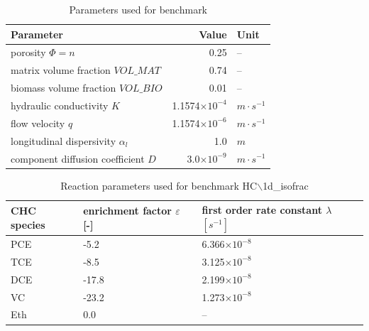 \begin{table}[htbp]
\caption{Parameters used for benchmark}
\centering
\begin{tabular}{lrl}
\hline
Parameter & Value & Unit \\
\hline
porosity $\Phi = n $  & 0.25 &  --  \\			
matrix volume fraction $VOL\_MAT $  & 0.74 &  --  \\			
biomass volume fraction $VOL\_BIO $  & 0.01 &  --  \\			
hydraulic conductivity $K$ & 1.1574$\times 10^{-4}$ & $m \cdot s^{-1}$ \\
flow velocity $q$ & 1.1574$\times 10^{-6}$ & $m \cdot s^{-1}$ \\
longitudinal dispersivity $\alpha_l$ & 1.0 & $m$ \\
component diffusion coefficient $D$ & 3.0$\times 10^{-9}$ & $m \cdot s^{-1}$ \\
\hline
\end{tabular}
\label{l_tab_benchmark_isofrac_flow}
\end{table}


\begin{table}[htbp]
\caption{Reaction parameters used for benchmark HC$\backslash$1d\_isofrac }
\centering
\begin{tabular}{|l|l|l|}
\hline
CHC species & enrichment factor $\varepsilon$ [-] & first order rate constant $\lambda $ $[s^{-1}]$ \\
\hline
PCE & -5.2 & 6.366$\times 10^{-8}$ \\
\hline
TCE & -8.5 & 3.125$\times 10^{-8}$ \\
\hline
DCE &  -17.8 & 2.199$\times 10^{-8}$ \\
\hline
VC & -23.2 & 1.273$\times 10^{-8}$ \\
\hline
Eth & 0.0 & -- \\	
\hline
\end{tabular}
\label{l_tab_benchmark_isofrac_react}
\end{table}


